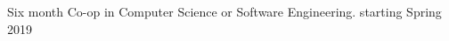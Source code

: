 

\begin{cvparagraph}

Six month Co-op in Computer Science or Software Engineering. starting Spring 2019
\end{cvparagraph}
